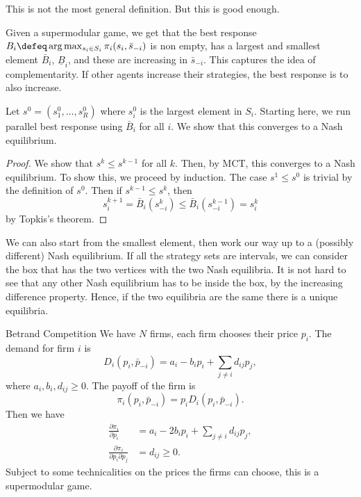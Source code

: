 \begin{remark}
    This is not the most general definition. But this is good enough.
\end{remark}
Given a supermodular game, we get that the best response $B_i\defeq \arg\max_{s_i\in S_i}\pi_i(s_i,\bar{s}_{-i})$ is non empty, has a largest and smallest element $\bar{B}_i$, $\underline{B}_i$, and these are increasing in $\bar{s}_{-i}$.
This captures the idea of complementarity. If other agents increase their strategies, the best response is to also increase. 

\begin{aexample}{}{}
    Let $s^0=(s_1^0,\ldots, s_R^0)$ where $s_i^0$ is the largest element in $S_i$. Starting here, we run parallel best response using $\bar{B}_i$ for all $i$. We show that this converges to a Nash equilibrium.
\end{aexample}
\begin{proof}
    We show that $s^k\leq s^{k-1}$ for all $k$. Then, by MCT, this converges to a Nash equilibrium. To show this, we proceed by induction. 
    The case $s^1\leq s^0$ is trivial by the definition of $s^0$.
    Then if $s^{k-1}\leq s^k$, then \[
    s_i^{k+1}=\bar{B}_i(s^k_{-i}) \leq \bar{B}_i(s^{k-1}_{-i}) = s_i^k
    \]
    by Topkis's theorem. 
\end{proof}
\begin{remark}
    We can also start from the smallest element, then work our way up to a (possibly different) Nash equilibrium. If all the strategy sets are intervals, we can consider the box that has the two vertices with the two Nash equilibria. It is not hard to see that any other Nash equilibrium has to be inside the box, by the increasing difference property. Hence, if the two equilibria are the same there is a unique equilibria.
\end{remark}
\begin{aexample}{Betrand Competition}{}
    We have $N$ firms, each firm chooses their price $p_i$. The demand for firm $i$ is \[
    D_i (p_i,\bar{p}_{-i})=a_i-b_ip_i+\sum_{j\neq i} d_{ij} p_j,
    \]where $a_i,b_i,d_{ij}\geq 0$.
    The payoff of the firm is \[
    \pi_i(p_i,\bar{p}_{-i})=p_iD_i(p_i,\bar{p}_{-i}).
    \]
    Then we have \begin{align*}
    \frac{\partial \pi_i}{\partial p_i} &= a_i-2b_ip_i+\sum_{j\neq i} d_{ij} p_j,\\
    \frac{\partial \pi_i}{\partial p_i\partial p_j} &= d_{ij} \geq 0.
    \end{align*}
    Subject to some technicalities on the prices the firms can choose, this is a supermodular game. 
\end{aexample}